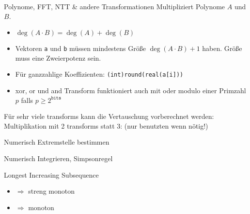 \begin{algorithm}{Polynome, FFT, NTT \& andere Transformationen}
Multipliziert Polynome $A$ und $B$.
	\begin{itemize}
		\item $\deg(A \cdot B) = \deg(A) + \deg(B)$
		\item Vektoren \lstinline{a} und \lstinline{b} müssen mindestens Größe
		$\deg(A \cdot B) + 1$ haben.
		Größe muss eine Zweierpotenz sein.
		\item Für ganzzahlige Koeffizienten: \lstinline{(int)round(real(a[i]))}
		\item xor, or und and Transform funktioniert auch mit  oder modulo einer Primzahl $p$ falls $p \geq 2^{\texttt{bits}}$
	\end{itemize}
	Für sehr viele transforms kann die Vertauschung vorberechnet werden:
	Multiplikation mit 2 transforms statt 3: (nur benutzten wenn nötig!)
\end{algorithm}

\begin{algorithm}{Numerisch Extremstelle bestimmen}
\end{algorithm}

\begin{algorithm}{Numerisch Integrieren, Simpsonregel}
\end{algorithm}

\begin{algorithm}{Longest Increasing Subsequence}
	\begin{itemize}
		\item {} $\Rightarrow$ streng monoton
		\item {} $\Rightarrow$ monoton
	\end{itemize}
\end{algorithm}

